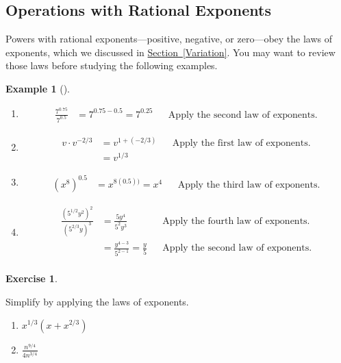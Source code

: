 \documentclass[10pt,]{book}
\theoremstyle{plain}
\theoremstyle{definition}
\theoremstyle{definition}
\theoremstyle{definition}
\newtheorem{example}[theorem]{Example}
\theoremstyle{definition}
\theoremstyle{definition}
\newtheorem{exercise}[theorem]{Exercise}
\numberwithin{equation}{section}
\newcommand{\amp}{ & }
\begin{document}
\subsection[Operations with Rational Exponents]{Operations with Rational Exponents}\label{subsection-79}

    Powers with rational exponents—positive, negative, or zero—obey the laws of exponents, which we discussed in \hyperref[Variation]{Section~\ref{Variation}}. You may want to review those laws before studying the following examples.
%
\begin{example}[]\label{example-operations-with-rational-exponents}
\leavevmode%
\begin{enumerate}[label=*\alph**]
\item\hypertarget{li-546}{}\begin{align*}
        \frac{7^{0.75}}{7^{0.5}}\amp= 7^{0.75−0.5} = 7^{0.25}
         \amp\amp \text{Apply the second law of exponents.}
         \end{align*}
    \item\hypertarget{li-547}{}\begin{align*}
        v \cdot v^{−2/3}\amp= v^{1+(−2/3)}
        \amp\amp \text{Apply the first law of exponents.}\\
        \amp  = v^{1/3}
        \end{align*}
    \item\hypertarget{li-548}{}\begin{align*}
        \left(x^8\right)^{0.5}\amp= x^{8(0.5))} = x^4
        \amp\amp \text{Apply the third law of exponents.}
        \end{align*}
    \item\hypertarget{li-549}{}\begin{align*}
        \frac{\left(5^{1/2}y^2\right)^2}{\left(5^{2/3} y\right)^3}  \amp= \frac{5y^4}{5^2 y^3}
        \amp\amp \text{Apply the fourth law of exponents.}\\
        \amp = \frac{y^{4−3}}{5^{2−1}}=\frac{y}{5}
        \amp\amp \text{Apply the second law of exponents.}\\
        \end{align*}
    \end{enumerate}
\end{example}
\begin{exercise}\label{exercise-operations-on-rational-exponents}

    Simplify by applying the laws of exponents.
    \leavevmode%
\begin{enumerate}[label=*\alph**]
\item\hypertarget{li-550}{}\( x^{1/3}\left(x + x^{2/3}\right)\)\item\hypertarget{li-551}{}\( \frac{n^{9/4}}{4n^{3/4}}\)\end{enumerate}
\end{exercise}
\typeout{************************************************}
\typeout{************************************************}
\end{document}

